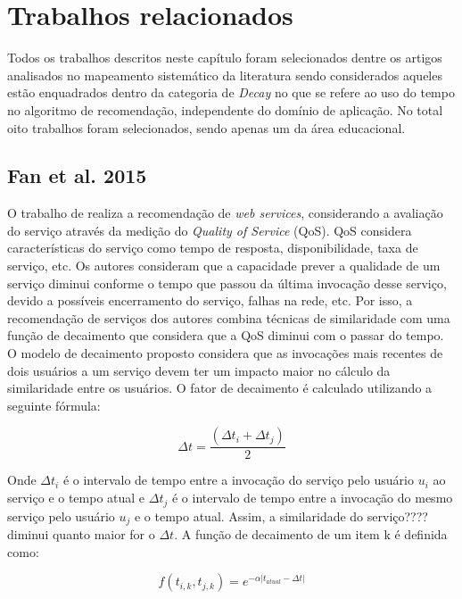 \chapter{Trabalhos relacionados}

Todos os trabalhos descritos neste capítulo foram selecionados dentre os artigos analisados no mapeamento sistemático
da literatura \cite{de2017time} sendo considerados aqueles  estão enquadrados dentro da categoria de \textit{Decay} no que
se refere ao uso do tempo no algoritmo de recomendação, independente do domínio de aplicação. No total oito trabalhos
foram selecionados, sendo apenas um da área educacional.

\section{Fan et al. 2015}

O trabalho de  realiza a recomendação de \textit{web services}, considerando a avaliação do serviço
através da medição do \textit{Quality of Service} (QoS). QoS considera características do serviço como tempo de resposta,
disponibilidade, taxa de serviço, etc. Os autores consideram que a capacidade prever a qualidade de um serviço diminui
conforme o tempo que passou da última invocação desse serviço, devido a possíveis encerramento do serviço, falhas na
rede, etc. Por isso, a recomendação de serviços dos autores combina técnicas de similaridade com uma função de
decaimento que considera que a QoS diminui com o passar do tempo. O modelo de decaimento proposto considera que as
invocações mais recentes de dois usuários a um serviço devem ter um impacto maior no cálculo da similaridade entre os
usuários. O fator de decaimento é calculado utilizando a seguinte fórmula:

\begin{equation}
  \Delta t = \frac{(\Delta t_i + \Delta t_j)}{2}
  \label{eq:fan-fator-decaimento}
\end{equation}


Onde $\Delta t_i$ é o intervalo de tempo entre a invocação do serviço pelo usuário $u_i$ ao serviço e o tempo atual e
$\Delta t_j$ é o intervalo de tempo entre a invocação do mesmo serviço pelo usuário $u_j$ e o tempo atual. Assim, a
similaridade do serviço????  diminui quanto maior for o $\Delta t$. A função de decaimento de um item k é definida como:

\begin{equation}
  f(t_{i,k}, t_{j,k}) = e^{-\alpha \left|t_{atual} - \Delta t \right|}
  \label{eq:fan-funcao-decaimento}
\end{equation}

